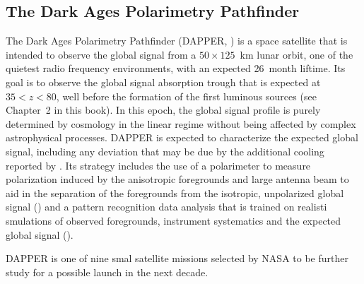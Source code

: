 \subsection{The Dark Ages Polarimetry Pathfinder}
The Dark Ages Polarimetry Pathfinder (DAPPER, \cite{burns19}) is a space satellite that is intended to observe the global signal from a $50 \times 125$~km lunar orbit, one of the quietest radio frequency environments, with an expected 26~month liftime. Its goal is to observe the global signal absorption trough that is expected at $35 < z < 80$, well before the formation of the first luminous sources (see Chapter~2 in this book). In this epoch, the global signal profile is purely determined by cosmology in the linear regime without being affected by complex astrophysical processes. DAPPER is expected to characterize the expected global signal, including any deviation that may be due by the additional cooling reported by \cite{bowman18}. Its strategy includes the use of a polarimeter to measure polarization induced by the anisotropic foregrounds and large antenna beam to aid in the separation of the foregrounds from the isotropic, unpolarized global signal (\cite{nhan17}) and a pattern recognition data analysis that is trained on realisti smulations of observed foregrounds, instrument systematics and the expected global signal (\cite{tauscher18}).

DAPPER is one of nine smal satellite missions selected by NASA to be further study for a possible launch in the next decade.

